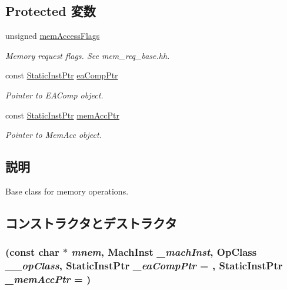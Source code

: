 \subsection*{Protected 変数}
\begin{DoxyCompactItemize}
\item 
unsigned \hyperlink{classPowerISA_1_1MemOp_a827c936c9e2b1f1cf21a01f204a8d821}{memAccessFlags}
\begin{DoxyCompactList}\small\item\em Memory request flags. See mem\_\-req\_\-base.hh. \item\end{DoxyCompactList}\item 
const \hyperlink{classRefCountingPtr}{StaticInstPtr} \hyperlink{classPowerISA_1_1MemOp_adb8a3682fa5971df32e2bf1109adc24d}{eaCompPtr}
\begin{DoxyCompactList}\small\item\em Pointer to EAComp object. \item\end{DoxyCompactList}\item 
const \hyperlink{classRefCountingPtr}{StaticInstPtr} \hyperlink{classPowerISA_1_1MemOp_a5349ed0f46076d7cc6e93c3e32b5adc7}{memAccPtr}
\begin{DoxyCompactList}\small\item\em Pointer to MemAcc object. \item\end{DoxyCompactList}\end{DoxyCompactItemize}


\subsection{説明}
Base class for memory operations. 

\subsection{コンストラクタとデストラクタ}
\hypertarget{classPowerISA_1_1MemOp_a82838d0e5b22689b703bb2a6da001132}{
\subsubsection[{MemOp}]{ (const char $\ast$ {\em mnem}, \/  {\bf MachInst} {\em \_\-machInst}, \/  OpClass {\em \_\-\_\-opClass}, \/  {\bf StaticInstPtr} {\em \_\-eaCompPtr} = {}, \/  {\bf StaticInstPtr} {\em \_\-memAccPtr} = {})}}
\label{classPowerISA_1_1MemOp_a82838d0e5b22689b703bb2a6da001132}



